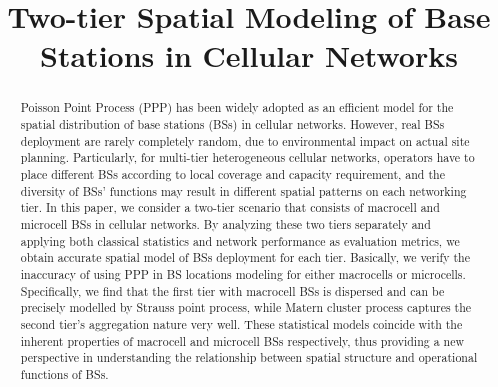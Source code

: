 \documentclass[conference]{IEEEtran}
\begin{document}



\title{Two-tier Spatial Modeling of Base Stations in Cellular Networks}

\author{
}
\maketitle


\begin{abstract}
Poisson Point Process (PPP) has been widely adopted as an efficient model for the spatial distribution of base stations (BSs) in cellular networks. However, real BSs deployment are rarely completely random, due to environmental impact on actual site planning. Particularly,  for multi-tier heterogeneous cellular networks, operators have to place different BSs according to local coverage and capacity requirement, and the diversity of BSs' functions may result in different spatial patterns on each networking tier. In this paper, we consider a two-tier scenario that consists of macrocell and microcell BSs in cellular networks. By analyzing these two tiers separately and applying both classical statistics and network performance as evaluation metrics, we obtain accurate spatial model of BSs deployment for each tier. Basically, we verify the inaccuracy of using PPP in BS locations modeling for either macrocells or microcells. Specifically, we find that the first tier with macrocell BSs is dispersed and can be precisely modelled by Strauss point process, while Matern cluster process captures the second tier's aggregation nature very well. These statistical models coincide with the inherent properties of macrocell and microcell BSs respectively, thus providing a new perspective in understanding the relationship between spatial structure and operational functions of BSs.
\end{abstract}
\IEEEpeerreviewmaketitle
\end{document}
